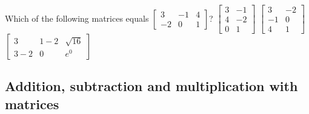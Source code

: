 \begin{activity}
Which of the following matrices equals \(\begin{bmatrix}  3&-1&4
\\-2&0&1\end{bmatrix}\)?
{\(\begin{bmatrix} 3&-1\\4
&-2\\0&1 \end{bmatrix}\)}
{\(\begin{bmatrix} 3&-2\\-1&0\\4&1 \end{bmatrix}\)}
{\(\begin{bmatrix} 3&1-2&\sqrt{16}
\\3-2&0&e^0 \end{bmatrix}\)}
\end{activity}







\subsection{Addition, subtraction and multiplication with matrices}
\label{sec:amwm}


